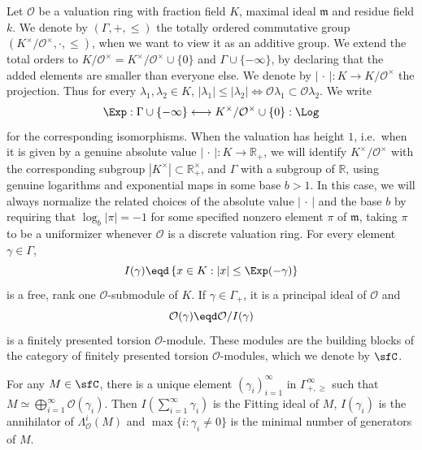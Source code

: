 Let $\mathcal{O}$ be a valuation ring with fraction field $K$, maximal ideal $\mathfrak{m}$ and residue field $k$. We denote by $(\Gamma,+,\leq)$ the totally ordered commutative group $(K^{\times}/\mathcal{O}^{\times},\cdot,\leq)$, when we want to view it as an additive group. We extend the total orders to $K/\mathcal{O}^{\times}=K^{\times}/\mathcal{O}^{\times}\cup\{0\}$ and $\Gamma\cup\{-\infty\}$, by declaring that the added elements are smaller than everyone else. We denote by $|{\,\cdot\,}|:K\rightarrow K/\mathcal{O}^{\times}$ the projection. Thus for every $\lambda_{1},\lambda_{2}\in K$, $\left|\lambda_{1}\right|\leq\left|\lambda_{2}\right|\iff\mathcal{O}\lambda_{1}\subset\mathcal{O}\lambda_{2}$. We write
\[
\Exp:\Gamma\cup\{-\infty\}\longleftrightarrow K^{\times}/\mathcal{O}^{\times}\cup\{0\}:\Log
\]
for the corresponding isomorphisms. When the valuation has height $1$, i.e.~when it is given by a genuine absolute value $|{\,\cdot\,}|:K\rightarrow\mathbb{R}_{+}$, we will identify $K^{\times}/\mathcal{O}^{\times}$ with the corresponding subgroup $\left|K^{\times}\right|\subset\mathbb{R}_{+}^{\times}$, and $\Gamma$ with a subgroup of $\mathbb{R}$, using genuine logarithms and exponential maps in some base $b>1$. In this case, we will always normalize the related choices of the absolute value $|{\,\cdot\,}|$ and the base $b$ by requiring that $\log_{b}\left|\pi\right|=-1$ for some specified nonzero element $\pi$ of $\mathfrak{m}$, taking $\pi$ to be a uniformizer whenever $\mathcal{O}$ is a discrete valuation ring. For every element $\gamma\in\Gamma$,
\[
I(\gamma)\eqd\left\{ x\in K:\left|x\right|\leq\Exp(-\gamma)\right\}
\]
is a free, rank one $\mathcal{O}$-submodule of $K$. If $\gamma\in\Gamma_{+}$, it is a principal ideal of $\mathcal{O}$ and
\[
\mathcal{O}(\gamma)\eqd\mathcal{O}/I(\gamma)
\]
is a finitely presented torsion $\mathcal{O}$-module. These modules are the building blocks of the category of finitely presented torsion $\mathcal{O}$-modules, which we denote by $\sfC$.

\begin{lemm}\label{lem:DefInvTorsionOmod}
For any $M\in\sfC$, there is a unique element $(\gamma_{i})_{i=1}^{\infty}$ in $\Gamma_{+,\geq}^{\infty}$ such that $M\simeq\bigoplus_{i=1}^{\infty}\mathcal{O}(\gamma_{i})$. Then $I(\sum_{i=1}^{\infty}\gamma_{i})$ is the Fitting ideal of $M$, $I(\gamma_{i})$ is the annihilator of $\Lambda_{\mathcal{O}}^{i}(M)$ and $\max\{i:\gamma_{i}\neq0\}$ is the minimal number of generators of $M$.
\end{lemm}

